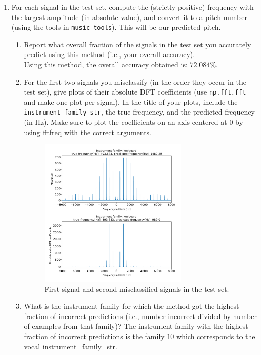 \documentclass[12pt,twoside]{article}
\begin{document}
\begin{enumerate}
\begin{enumerate}
    
  \item For each signal in the test set, compute the (strictly positive)
    frequency with the largest amplitude (in absolute value), and
    convert it to a pitch number (using the tools in
    \texttt{music\_tools}).  This will be our predicted pitch.
    \begin{enumerate}
    \item Report what overall fraction of the signals in
      the test set you accurately predict using this method (i.e.,
      your overall accuracy).\\
      Using this method, the overall accuracy obtained is: $72.084\%$.
    \item For the
      first two signals you misclassify (in the order they occur in the
      test set), give plots of their absolute
      DFT coefficients (use \texttt{np.fft.fft} and make one plot per
      signal). In the title of your plots, include the
      \texttt{instrument\_family\_str}, the true frequency, and the
      predicted frequency (in Hz).  Make
      sure to plot the coefficients on an axis centered at $0$ by using
      fftfreq with the correct arguments.\\
      
	\begin{figure}[H]
		\centering
		\captionsetup{justification=centering}
		\includegraphics[width=200pt]{code/musicdata/misclassified_signals.pdf}
		\caption{First signal and second misclassified signals in the test set.}
	\end{figure}

      
    \item What is the instrument family for which the method got the
      highest fraction of incorrect predictions (i.e., number incorrect
      divided by number of examples from that family)?
      The instrument family with the highest fraction of incorrect predictions is the family $10$ which corresponds
      to the vocal instrument\_family\_str.
      

\end{enumerate}
\end{enumerate}
\end{enumerate}
\end{document}
